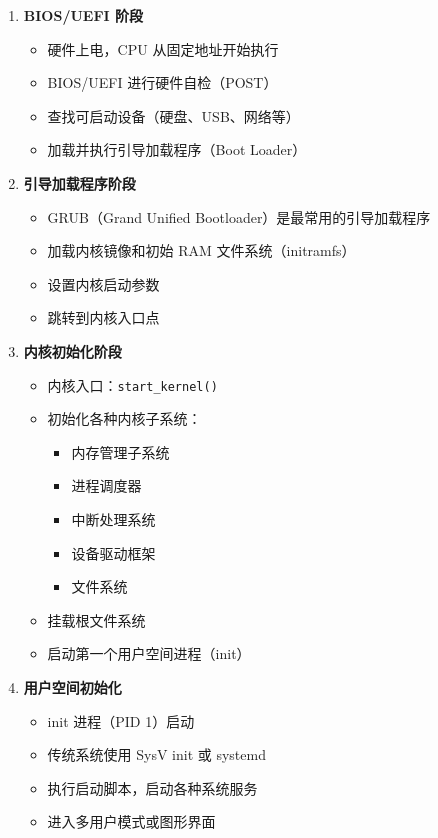 \begin{enumerate}
  \item \textbf{BIOS/UEFI 阶段}
    \begin{itemize}
      \item 硬件上电，CPU 从固定地址开始执行
      \item BIOS/UEFI 进行硬件自检（POST）
      \item 查找可启动设备（硬盘、USB、网络等）
      \item 加载并执行引导加载程序（Boot Loader）
    \end{itemize}

  \item \textbf{引导加载程序阶段}
    \begin{itemize}
      \item GRUB（Grand Unified Bootloader）是最常用的引导加载程序
      \item 加载内核镜像和初始 RAM 文件系统（initramfs）
      \item 设置内核启动参数
      \item 跳转到内核入口点
    \end{itemize}

  \item \textbf{内核初始化阶段}
    \begin{itemize}
      \item 内核入口：\texttt{start\_kernel()}
      \item 初始化各种内核子系统：
        \begin{itemize}
          \item 内存管理子系统
          \item 进程调度器
          \item 中断处理系统
          \item 设备驱动框架
          \item 文件系统
        \end{itemize}
      \item 挂载根文件系统
      \item 启动第一个用户空间进程（init）
    \end{itemize}

  \item \textbf{用户空间初始化}
    \begin{itemize}
      \item init 进程（PID 1）启动
      \item 传统系统使用 SysV init 或 systemd
      \item 执行启动脚本，启动各种系统服务
      \item 进入多用户模式或图形界面
    \end{itemize}
\end{enumerate}

